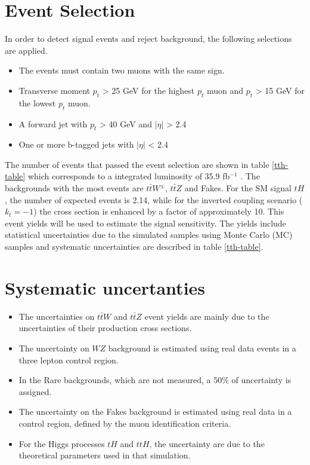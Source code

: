 \section{Event Selection}
In order to detect signal events and reject background, the following selections are applied. 
\begin{itemize}
	\item The events must contain two muons with the same sign.
	\item Transverse moment $p_{t}$ > 25 GeV for the highest $p_t$ muon and $p_{t}$ > 15 GeV for the lowest $p_t$ muon.
	\item A forward jet with $p_t$ > 40 GeV and $|\eta|$ > 2.4
	\item One or more b-tagged jets with $|\eta|$ < 2.4
\end{itemize}
The number of events that passed the event selection are shown in table \ref{tth-table} which corresponds to a integrated luminosity of 35.9 fb$^{-1}$ \cite{th1}.
The backgrounds with the most events are $t\bar{t} W^\pm$, $t\bar{t}Z$ and Fakes. For the SM signal $tH$, the number of expected events is 2.14, while for the inverted coupling scenario ($k_t=-1$) the cross section is enhanced by a factor of approximately 10. 
This event yields will be used to estimate the signal sensitivity. The yields include statistical uncertainties due to the simulated samples using Monte Carlo (MC) samples and systematic uncertainties are described in table \ref{tth-table}. 


\section{Systematic uncertanties}
\begin{itemize}
\item The uncertainties on $t\bar{t}W$ and $t\bar{t}Z$ event yields are mainly due to the uncertainties of their production cross sections. 
\item The uncertainty on $WZ$ background is estimated using real data events in a three lepton control region. 
\item In the Rare backgrounds, which are not measured, a $50\%$ of uncertainty is assigned.
\item The uncertainty on the Fakes background is estimated using real data in a control region, defined by the muon identification criteria. 
\item For the Higgs processes $tH$ and $ttH$, the uncertainty are due to the theoretical parameters used in that simulation.
\end{itemize}

